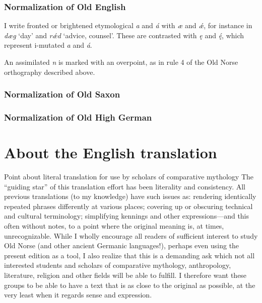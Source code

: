    \subsubsection{Normalization of Old English}
    I write fronted or brightened etymological \emph{a} and \emph{á} with \emph{æ} and \emph{ǽ}, for instance in \emph{dæg} ‘day’ and \emph{rǽd} ‘advice, counsel’.  These are contrasted with \emph{ę} and \emph{ę́}, which represent i-mutated \emph{a} and \emph{á}.

    An assimilated \emph{n} is marked with an overpoint, as in rule 4 of the Old Norse orthography described above.

    \subsubsection{Normalization of Old Saxon}

    \subsubsection{Normalization of Old High German}

  \section{About the English translation}
    Point about literal translation for use by scholars of comparative mythology
      The “guiding star” of this translation effort has been literality and consistency. All previous translations (to my knowledge) have such issues as: rendering identically repeated phrases differently at various places; covering up or obscuring technical and cultural terminology; simplifying kennings and other expressions—and this often without notes, to a point where the original meaning is, at times, unrecognizable.
      While I wholly encourage all readers of sufficient interest to study Old Norse (and other ancient Germanic languages!), perhaps even using the present edition as a tool, I also realize that this is a demanding ask which not all interested students and scholars of comparative mythology, anthropology, literature, religion and other fields will be able to fulfill. I therefore want these groups to be able to have a text that is as close to the original as possible, at the very least when it regards sense and expression.
